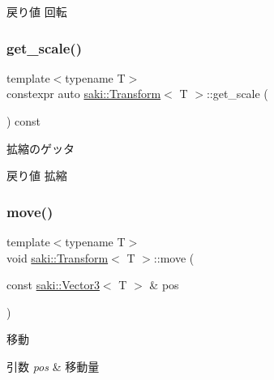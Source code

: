 \begin{DoxyReturn}{戻り値}
回転 
\end{DoxyReturn}
\mbox{\label{classsaki_1_1_transform_a9bf1b1c0b061165e67013538bc2afdb2}} 
\subsubsection{\texorpdfstring{get\+\_\+scale()}{get\_scale()}}
{\footnotesize\ttfamily template$<$typename T$>$ \\
constexpr auto \mbox{\hyperlink{classsaki_1_1_transform}{saki\+::\+Transform}}$<$ T $>$\+::get\+\_\+scale (\begin{DoxyParamCaption}{ }\end{DoxyParamCaption}) const\hspace{0.3cm}{\ttfamily [inline]}}



拡縮のゲッタ 

\begin{DoxyReturn}{戻り値}
拡縮 
\end{DoxyReturn}
\mbox{\label{classsaki_1_1_transform_a997aaa3a40a960383e690b6c70665331}} 
\subsubsection{\texorpdfstring{move()}{move()}\hspace{0.1cm}{\footnotesize\ttfamily [1/2]}}
{\footnotesize\ttfamily template$<$typename T$>$ \\
void \mbox{\hyperlink{classsaki_1_1_transform}{saki\+::\+Transform}}$<$ T $>$\+::move (\begin{DoxyParamCaption}\item[{const \mbox{\hyperlink{classsaki_1_1_vector3}{saki\+::\+Vector3}}$<$ T $>$ \&}]{pos }\end{DoxyParamCaption})\hspace{0.3cm}{\ttfamily [inline]}}



移動 


\begin{DoxyParams}{引数}
{\em pos} & 移動量 \\
\hline
\end{DoxyParams}
\mbox{\label{classsaki_1_1_transform_ad82b8e7ab975ebbce54f7d0db2489ac7}} 
